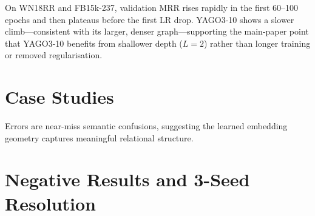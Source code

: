 On WN18RR and FB15k-237, validation MRR rises rapidly in the first 60--100 epochs and then plateaus before the first LR drop. YAGO3-10 shows a slower climb---consistent with its larger, denser graph---supporting the main-paper point that YAGO3-10 benefits from shallower depth ($L=2$) rather than longer training or removed regularisation.

\section{Case Studies}
\label{app:case}

\begin{table}[!htbp]
\centering
\caption{Qualitative examples on WN18RR test set. Correct tail entity in . Top-5 predictions shown.}
\label{tab:case}
\footnotesize
\setlength{\tabcolsep}{3pt}
\end{table}

Errors are near-miss semantic confusions, suggesting the learned embedding geometry captures meaningful relational structure.

\section{Negative Results and 3-Seed Resolution}
\label{app:negative}

